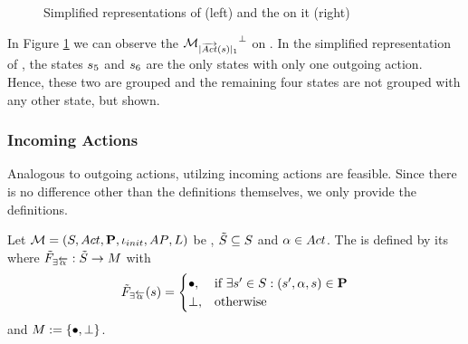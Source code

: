 \documentclass[preview]{standalone}
\begin{document}
\begin{figure}[!htb]
	\begin{minipage}{.5\textwidth}
		\hspace{5mm}
		
	\end{minipage}%
	\begin{minipage}{.5\textwidth}						
		\centering
		
	\end{minipage}	
	\caption{Simplified representations of \mdp (left) and the \viewN \viewoutactsetsize on it (right)}	
	\label{fig:outActSingle} 	
\end{figure}

\begin{exmp}
	In Figure \ref{fig:outActSingle} we can observe the \viewN $\viewoutactsingle$ on \chgph. In the simplified representation of \achgphN, the states ${s}_5$ and ${s}_6$ are the only states with only one outgoing action. Hence, these two are grouped and the remaining four states are not grouped with any other state, but shown.
\end{exmp}

\subsubsection{Incoming Actions}
Analogous to outgoing actions, \viewsN utilzing incoming actions are feasible. Since there is no difference other than the definitions themselves, we only provide the definitions.

\begin{definition}
	Let ${{{\mathcal{M}}}} = {{({S}, {Act}, {\textbf{P}}, {\iota_{init}}, {AP}, {L})}}$ be \achgphN, ${\tilde{{S}}} \subseteq {S}$ and ${\alpha} \in {Act}$. The \viewN \viewhasinaction is defined by its \grpfctN \gfcthasinaction where ${{\tilde{F}_{{\exists{\overleftarrow{\ensuremath{{\alpha}}}}}}}} : {\tilde{{S}}} \to {\ensuremath{{M}}}$ with
	\[
	{{\tilde{F}_{{\exists{\overleftarrow{\ensuremath{{\alpha}}}}}}}}({s}) =
	\begin{cases}
			{\bullet},				& \text{if } \exists {s}' \in {S}: ({s}', {\alpha}, {s}) \in {\ensuremath{{\textbf{P}}}} \\
			{\bot},     	& \text{otherwise}
		\end{cases}
	\]
	and ${{M}} := {\{{\bullet}, {\bot}\}}$.	
	\label{def:mininaction}
\end{definition}	
\end{document}
